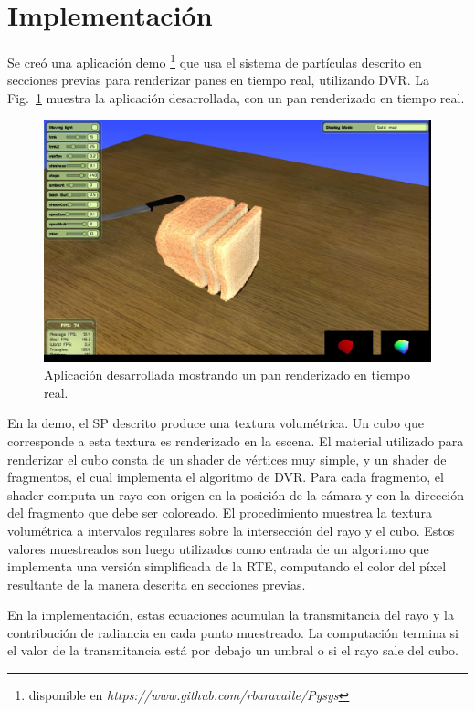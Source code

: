 \section{Implementación}

Se creó una aplicación demo \footnote{disponible en \emph{https://www.github.com/rbaravalle/Pysys}}  que usa el sistema de partículas descrito en secciones previas para renderizar panes en tiempo real, utilizando DVR.
La Fig.~\ref{fg:application} muestra la aplicación desarrollada, con un pan renderizado en tiempo real.


\begin{figure}
  \centerline{\includegraphics[width=13cm]{figures/application}}
  \caption{Aplicación desarrollada mostrando un pan renderizado en tiempo real.}
  \label{fg:application}
\end{figure}


En la demo, el SP descrito produce una textura volumétrica.
Un cubo que corresponde a esta textura es renderizado en la escena.
El material utilizado para renderizar el cubo consta de un shader de vértices muy simple, y un shader de fragmentos, el cual implementa el algoritmo de DVR.
Para cada fragmento, el shader computa un rayo con origen en la posición de la cámara y con la dirección del fragmento que debe ser coloreado.
El procedimiento muestrea la textura volumétrica a intervalos regulares sobre la intersección del rayo y el cubo.
Estos valores muestreados son luego utilizados como entrada de un algoritmo que implementa una versión simplificada de la RTE, computando el color del píxel resultante de la manera descrita en secciones previas.

En la implementación, estas ecuaciones acumulan la transmitancia del rayo y la contribución de radiancia en cada punto muestreado.
La computación termina si el valor de la transmitancia está por debajo un umbral o si el rayo sale del cubo.

